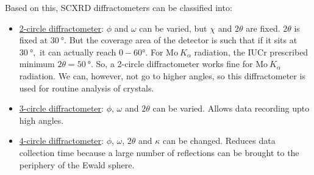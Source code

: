 Based on this, SCXRD diffractometers can be classified into:%
%	
	\begin{itemize}%
%	
	    \item \ul{2-circle diffractometer}: $\phi$ and $\omega$ can be varied, but $\chi$ and $2\theta$ are fixed. $2\theta$ is fixed at $\SI{30}{\degree}.$ But the coverage area of the detector is such that if it sits at $\SI{30}{\degree},$ it can actually reach $0-60\si{\degree}.$ For $\mathrm{Mo}~K_\alpha$ radiation, the IUCr prescribed minimum $2\theta = \SI{50}{\degree}.$ So, a 2-circle diffractometer works fine for $\mathrm{Mo}~K_\alpha$ radiation. We can, however, not go to higher angles, so this diffractometer is used for routine analysis of crystals.
	    
	    \item \ul{3-circle diffractometer}: $\phi$, $\omega$ and $2\theta$ can be varied. Allows data recording upto high angles.
	    
	    \item \ul{4-circle diffractometer}: $\phi$, $\omega$, $2\theta$ and $\kappa$ can be changed. Reduces data collection time because a large number of reflections can be brought to the periphery of the Ewald sphere.
	    
	\end{itemize}
	
